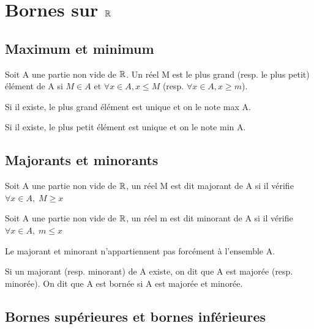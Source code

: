\documentclass[a4paper, 12pt]{article}
\begin{document}
\section{Bornes sur $\mathbb{R}$}

\subsection{Maximum et minimum}

\begin{definition}
    Soit A une partie non vide de $\mathbb{R}$. Un réel M est le plus grand (resp. le plus petit) élément de A si $M \in A$ et
    $\forall x \in A, x \leq M$ (resp. $\forall x \in A, x \geq m$).

    Si il existe, le plus grand élément est unique et on le note max A.

    Si il existe, le plus petit élément est unique et on le note min A.
\end{definition}




\subsection{Majorants et minorants}

\begin{definition}
    Soit A une partie non vide de $\mathbb{R}$, un réel M est dit majorant de A si il vérifie $\forall x \in A, \; M \geq x$
\end{definition}

\begin{definition}
    Soit A une partie non vide de $\mathbb{R}$, un réel m est dit minorant de A si il vérifie $\forall x \in A, \; m \leq x$
\end{definition}

\begin{remark}
    Le majorant et minorant n'appartiennent pas forcément à l'ensemble A.
\end{remark}

\begin{definition}
    Si un majorant (resp. minorant) de A existe, on dit que A est majorée (resp. minorée). On dit que A est bornée si A est majorée et minorée.
\end{definition}

\subsection{Bornes supérieures et bornes inférieures}
\end{document}
